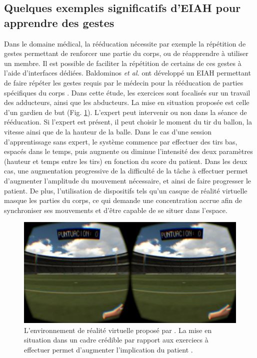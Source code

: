 \subsection{Quelques exemples significatifs d’EIAH pour apprendre des gestes}
Dans le domaine médical, la rééducation nécessite par exemple la répétition de gestes permettant de renforcer une partie du corps, ou de réapprendre à utiliser un membre. Il est possible de faciliter la répétition de certains de ces gestes à l'aide d'interfaces dédiées. Baldominos \textit{et al.} ont développé un EIAH permettant de faire répéter les gestes requis par le médecin pour la rééducation de parties spécifiques du corps \parencite{Baldominos2015AAt}. Dans cette étude, les exercices sont focalisés sur un travail des adducteurs, ainsi que les abducteurs. La mise en situation proposée est celle d'un gardien de but (Fig. \ref{fig:eiah_baldominos}). L'expert peut intervenir ou non dans la séance de rééducation. Si l'expert est présent, il peut choisir le moment du tir du ballon, la vitesse ainsi que de la hauteur de la balle. Dans le cas d'une session d'apprentissage sans expert, le système commence par effectuer des tirs bas, espacés dans le temps, puis augmente ou diminue l'intensité des deux paramètres (hauteur et temps entre les tirs) en fonction du score du patient. Dans les deux cas, une augmentation progressive de la difficulté de la tâche à effectuer permet d'augmenter l'amplitude du mouvement nécessaire, et ainsi de faire progresser le patient. De plus, l'utilisation de dispositifs tels qu'un casque de réalité virtuelle masque les parties du corps, ce qui demande une concentration accrue afin de synchroniser ses mouvements et d'être capable de se situer dans l'espace. %

\begin{figure}
    \centering
    \includegraphics[width=\textwidth]{pictures/eiah_baldominos.png}
    \caption[EIAH pour la rééducation \parencite{Baldominos2015AAt}]{L'environnement de réalité virtuelle proposé par \parencite{Baldominos2015AAt}. La mise en situation dans un cadre crédible par rapport aux exerciecs à effectuer permet d'augmenter l'implication du patient \parencite{Baldominos2015AAt}.}
    \label{fig:eiah_baldominos}
\end{figure}

